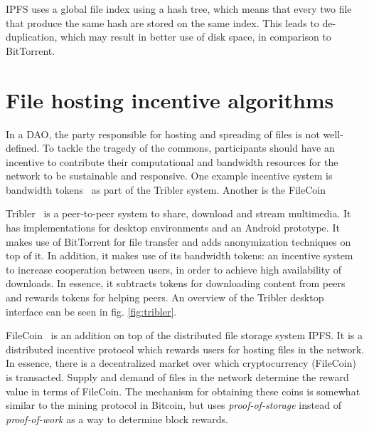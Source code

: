 IPFS uses a global file index using a hash tree, which means that every two file that produce the same hash are stored on the same index. This leads to de-duplication, which may result in better use of disk space, in comparison to BitTorrent.



\section{File hosting incentive algorithms}
\label{sec:file-spreading-incentives}
In a DAO, the party responsible for hosting and spreading of files is not well-defined. To tackle the tragedy of the commons, participants should have an incentive to contribute their computational and bandwidth resources for the network to be sustainable and responsive. One example incentive system is bandwidth tokens~\citep{de2018blockchain} as part of the Tribler system. Another is the FileCoin 

Tribler~\citep{pouwelse2008tribler} is a peer-to-peer system to share, download and stream multimedia. It has implementations for desktop environments and an Android prototype. It makes use of BitTorrent for file transfer and adds anonymization techniques on top of it. In addition, it makes use of its bandwidth tokens: an incentive system to increase cooperation between users, in order to achieve high availability of downloads. In essence, it subtracts tokens for downloading content from peers and rewards tokens for helping peers. An overview of the Tribler desktop interface can be seen in fig. \ref{fig:tribler}.

FileCoin~\citep{benet2018filecoin} is an addition on top of the distributed file storage system IPFS. It is a distributed incentive protocol which rewards users for hosting files in the network. In essence, there is a decentralized market over which cryptocurrency (FileCoin) is transacted. Supply and demand of files in the network determine the reward value in terms of FileCoin. The mechanism for obtaining these coins is somewhat similar to the mining protocol in Bitcoin, but uses \textit{proof-of-storage} instead of \textit{proof-of-work} as a way to determine block rewards.